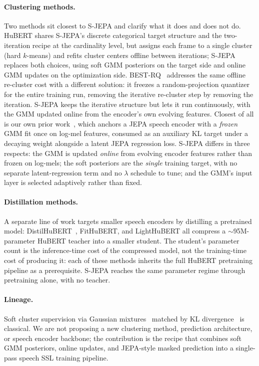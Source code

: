 \documentclass[9pt,twocolumn]{article}
\theoremstyle{plain}
\theoremstyle{definition}
\theoremstyle{remark}
\begin{document}
\paragraph{Clustering methods.} Two methods sit closest to S-JEPA and clarify what it does and does not do. HuBERT shares S-JEPA's discrete categorical target structure and the two-iteration recipe at the cardinality level, but assigns each frame to a single cluster (hard $k$-means) and refits cluster centers offline between iterations; S-JEPA replaces both choices, using soft GMM posteriors on the target side and online GMM updates on the optimization side. BEST-RQ~\citep{chiu2022bestrq} addresses the same offline re-cluster cost with a different solution: it freezes a random-projection quantizer for the entire training run, removing the iterative re-cluster step by removing the iteration. S-JEPA keeps the iterative structure but lets it run continuously, with the GMM updated online from the encoder's own evolving features. Closest of all is our own prior work~\citep{ioannides2026softanchors}, which anchors a JEPA speech encoder with a \emph{frozen} GMM fit once on log-mel features, consumed as an auxiliary KL target under a decaying weight alongside a latent JEPA regression loss. S-JEPA differs in three respects: the GMM is updated \emph{online} from evolving encoder features rather than frozen on log-mels; the soft posteriors are the \emph{single} training target, with no separate latent-regression term and no $\lambda$ schedule to tune; and the GMM's input layer is selected adaptively rather than fixed.

\paragraph{Distillation methods.} A separate line of work targets smaller speech encoders by distilling a 
pretrained model: DistilHuBERT~\citep{chang2022distilhubert}, FitHuBERT, 
and LightHuBERT all compress a $\sim$95M-parameter HuBERT teacher into a 
smaller student. The student's parameter count is the inference-time 
cost of the compressed model, not the training-time cost of producing 
it: each of these methods inherits the full HuBERT pretraining pipeline 
as a prerequisite. S-JEPA reaches the same parameter regime through 
pretraining alone, with no teacher.

\paragraph{Lineage.} Soft cluster supervision via Gaussian mixtures~\citep{dempster1977em,bishop2006pattern} matched by KL divergence~\citep{tishby2000information} is classical. We are not proposing a new clustering method, prediction architecture, or speech encoder backbone; the contribution is the recipe that combines soft GMM posteriors, online updates, and JEPA-style masked prediction into a single-pass speech SSL training pipeline.
 
\end{document}
